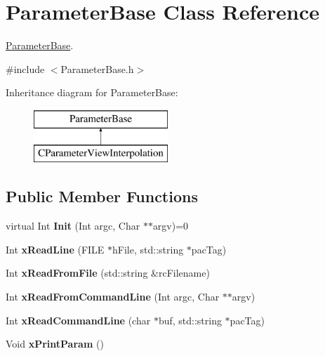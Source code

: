 \hypertarget{class_parameter_base}{}\section{Parameter\+Base Class Reference}
\label{class_parameter_base}


\hyperlink{class_parameter_base}{Parameter\+Base}.  




{\ttfamily \#include $<$Parameter\+Base.\+h$>$}

Inheritance diagram for Parameter\+Base\+:\begin{figure}[H]
\begin{center}
\leavevmode
\includegraphics[height=2.000000cm]{class_parameter_base}
\end{center}
\end{figure}
\subsection*{Public Member Functions}
\begin{DoxyCompactItemize}
\item 
\mbox{\label{class_parameter_base_a1f149811385414fcf390892910c2d2dd}} 
virtual Int {\bfseries Init} (Int argc, Char $\ast$$\ast$argv)=0
\item 
\mbox{\label{class_parameter_base_a2f9e483f5231ed904f79676c77643a03}} 
Int {\bfseries x\+Read\+Line} (F\+I\+LE $\ast$h\+File, std\+::string $\ast$pac\+Tag)
\item 
\mbox{\label{class_parameter_base_a6167edf985cccca900b333ace61864e0}} 
Int {\bfseries x\+Read\+From\+File} (std\+::string \&rc\+Filename)
\item 
\mbox{\label{class_parameter_base_a3dbbdbf3f40a32470da3b8bfaeb9850b}} 
Int {\bfseries x\+Read\+From\+Command\+Line} (Int argc, Char $\ast$$\ast$argv)
\item 
\mbox{\label{class_parameter_base_ae0ea9892550a61efaef5ec2e621cc1ac}} 
Int {\bfseries x\+Read\+Command\+Line} (char $\ast$buf, std\+::string $\ast$pac\+Tag)
\item 
\mbox{\label{class_parameter_base_a079ee1facad1ead2a6dd14dd25f4b3ae}} 
Void {\bfseries x\+Print\+Param} ()
\end{DoxyCompactItemize}
